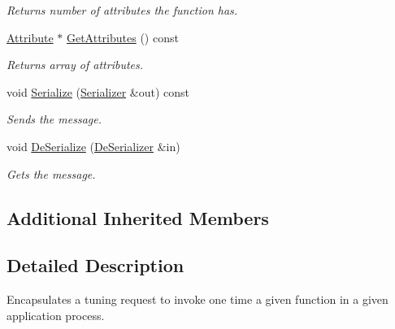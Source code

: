 \begin{DoxyCompactItemize}
\begin{DoxyCompactList}\small\item\em Returns number of attributes the function has. \end{DoxyCompactList}\item 
\hypertarget{class_common_1_1_one_time_function_call_request_a6bea986467c6378d109aba2127fb2430}{\hyperlink{class_common_1_1_attribute}{Attribute} $\ast$ \hyperlink{class_common_1_1_one_time_function_call_request_a6bea986467c6378d109aba2127fb2430}{Get\-Attributes} () const }\label{class_common_1_1_one_time_function_call_request_a6bea986467c6378d109aba2127fb2430}

\begin{DoxyCompactList}\small\item\em Returns array of attributes. \end{DoxyCompactList}\item 
\hypertarget{class_common_1_1_one_time_function_call_request_a57294d4635ce2e919478291cc663b7af}{void \hyperlink{class_common_1_1_one_time_function_call_request_a57294d4635ce2e919478291cc663b7af}{Serialize} (\hyperlink{class_common_1_1_serializer}{Serializer} \&out) const }\label{class_common_1_1_one_time_function_call_request_a57294d4635ce2e919478291cc663b7af}

\begin{DoxyCompactList}\small\item\em Sends the message. \end{DoxyCompactList}\item 
\hypertarget{class_common_1_1_one_time_function_call_request_a92632184f0dd15656ff30cd436bc0594}{void \hyperlink{class_common_1_1_one_time_function_call_request_a92632184f0dd15656ff30cd436bc0594}{De\-Serialize} (\hyperlink{class_common_1_1_de_serializer}{De\-Serializer} \&in)}\label{class_common_1_1_one_time_function_call_request_a92632184f0dd15656ff30cd436bc0594}

\begin{DoxyCompactList}\small\item\em Gets the message. \end{DoxyCompactList}\end{DoxyCompactItemize}
\subsection*{Additional Inherited Members}


\subsection{Detailed Description}
Encapsulates a tuning request to invoke one time a given function in a given application process. 

